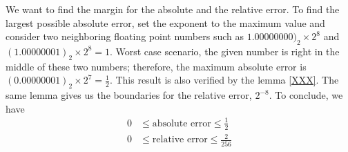 %
%
\begin{exmp}
    We want to find the margin for the absolute and the relative error. To find the largest possible absolute error, set the exponent to the maximum value and consider two neighboring floating point numbers such as \(1.00000000)_2 \times 2^8\) and \((1.00000001)_2 \times 2^8 = 1\). Worst case scenario, the given number is right in the middle of these two numbers; therefore, the maximum absolute error is \((0.00000001)_2 \times 2^7 = \frac{1}{2}\). This result is also verified by the lemma \ref{XXX}. The same lemma gives us the boundaries for the relative error, \(2^{-8}\). To conclude, we have
    \begin{align*}
        0 &\leq \text{absolute error} \leq \frac{1}{2} \\
        0 &\leq \text{relative error} \leq \frac{2}{256}
    \end{align*}
\end{exmp}
%
%
%
